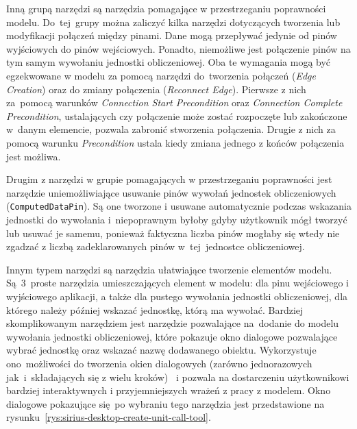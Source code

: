 Inną grupą narzędzi są narzędzia pomagające w przestrzeganiu poprawności
modelu. Do~tej~grupy można zaliczyć kilka narzędzi dotyczących tworzenia lub
modyfikacji połączeń między pinami. Dane mogą przepływać jedynie od pinów
wyjściowych do pinów wejściowych. Ponadto, niemożliwe jest połączenie pinów
na tym samym wywołaniu jednostki obliczeniowej. Oba te wymagania mogą być
egzekwowane w modelu za pomocą narzędzi do~tworzenia połączeń (\emph{Edge
	Creation}) oraz do zmiany połączenia (\emph{Reconnect Edge}). Pierwsze
z nich za~pomocą warunków \emph{Connection Start Precondition} oraz
\emph{Connection Complete Precondition}, ustalających czy połączenie może
zostać
rozpoczęte lub zakończone w~danym elemencie, pozwala zabronić stworzenia
połączenia. Drugie z nich za pomocą warunku \emph{Precondition} ustala kiedy
zmiana jednego z końców połączenia jest możliwa.

Drugim z narzędzi w grupie pomagających w przestrzeganiu poprawności jest
narzędzie uniemożliwiające usuwanie pinów wywołań jednostek obliczeniowych
(\texttt{ComputedDataPin}). Są one tworzone i usuwane automatycznie podczas
wskazania jednostki do wywołania i~niepoprawnym byłoby gdyby użytkownik mógł
tworzyć lub usuwać je samemu, ponieważ faktyczna liczba pinów mogłaby się
wtedy nie
zgadzać z liczbą zadeklarowanych pinów w~tej~jednostce obliczeniowej.

Innym typem narzędzi są narzędzia ułatwiające tworzenie elementów modelu.
Są~3~proste narzędzia umieszczających element w modelu: dla pinu wejściowego i
wyjściowego aplikacji, a także dla pustego wywołania jednostki obliczeniowej,
dla
którego należy później wskazać jednostkę, którą ma wywołać. Bardziej
skomplikowanym
narzędziem jest narzędzie pozwalające na~dodanie do modelu wywołania jednostki
obliczeniowej, które pokazuje okno dialogowe pozwalające wybrać jednostkę oraz
wskazać nazwę dodawanego obiektu. Wykorzystuje ono~możliwości \SiriusDesktop{}
do tworzenia okien dialogowych (zarówno jednorazowych
jak~i~składających się z wielu
kroków)~\cite{sirius-desktop-documentation-tools} i
pozwala na dostarczeniu użytkownikowi
bardziej interaktywnych i przyjemniejszych wrażeń z pracy z modelem. Okno
dialogowe
pokazujące się po wybraniu
tego narzędzia jest przedstawione na
rysunku~\ref{rys:sirius-desktop-create-unit-call-tool}.

